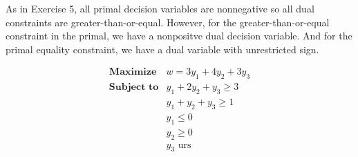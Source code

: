 \documentclass[12pt]{article}
\theoremstyle{definition}
\begin{document}
As in Exercise 5, all primal decision variables are nonnegative so all dual constraints are greater-than-or-equal. However, for the greater-than-or-equal constraint in the primal, we have a nonpositve dual decision variable. And for the primal equality constraint, we have a dual variable with unrestricted sign.

\[
    \begin{array}{ll}
        \textbf{Maximize} & w = 3y_1 + 4y_2 + 3y_3 \\
        \textbf{Subject to} & y_1 + 2y_2 + y_3 \geq 3 \\
            & y_1 + y_2 + y_3 \geq 1 \\
            & y_1 \leq 0 \\
            & y_2 \geq 0 \\
            & y_3 \text{ urs}
    \end{array}
\]
\end{document}
